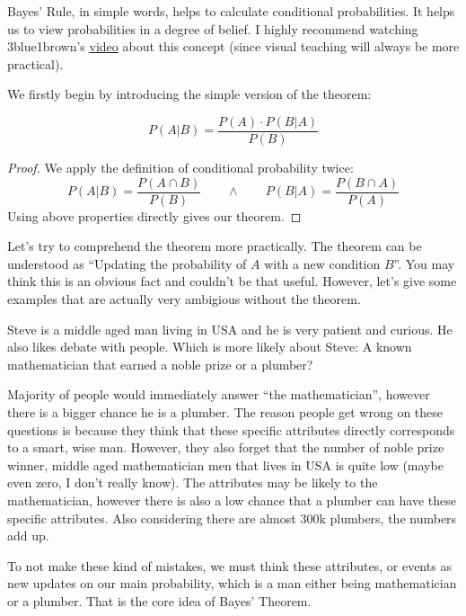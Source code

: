 Bayes' Rule, in simple words, helps to calculate conditional probabilities. It helps us to view probabilities in a degree of belief. I highly recommend watching 3blue1brown's \href{https://www.youtube.com/watch?v=HZGCoVF3YvM&feature=emb_title}{video} about this concept (since visual teaching will always be more practical).

\par

We firstly begin by introducing the simple version of the theorem:
\begin{theorem}
    $$ P(A|B) = \frac{P(A) \cdot P(B|A)}{P(B)} $$
\end{theorem} 

\begin{proof}
    We apply the definition of conditional probability twice:
    $$ P(A|B) = \frac{P(A \cap B)}{P(B)} \qquad \land \qquad  P(B|A) = \frac{P(B \cap A)}{P(A)}$$
    Using above properties directly gives our theorem.
\end{proof}

\par 
Let's try to comprehend the theorem more practically. The theorem can be understood as ``Updating the probability of $A$ with a new condition $B$''. You may think this is an obvious fact and couldn't be that useful. However, let's give some examples that are actually very ambigious without the theorem.

\begin{example}
    Steve is a middle aged man  living in USA and he is very patient and curious. He also likes debate with people.  Which is more likely about Steve: A known mathematician that earned a noble prize or a plumber? 
    \newline
    \par
    Majority of people would immediately answer ``the mathematician'', however there is a bigger chance he is a plumber. The reason people get wrong on these questions is because they think that these specific attributes directly corresponds to a smart, wise man. However, they also forget that the number of  noble prize winner, middle aged mathematician men that lives in USA is quite low (maybe even zero, I don't really know).
    The attributes may be likely to the mathematician, however there is also a low chance that a plumber can have these specific attributes. Also considering there are almost $300$k plumbers, the numbers add up.

    \par 

    To not make these kind of mistakes, we must think these attributes, or events as new updates on our main probability, which is a man either being mathematician or a plumber. That is the core idea of Bayes' Theorem.
\end{example}

